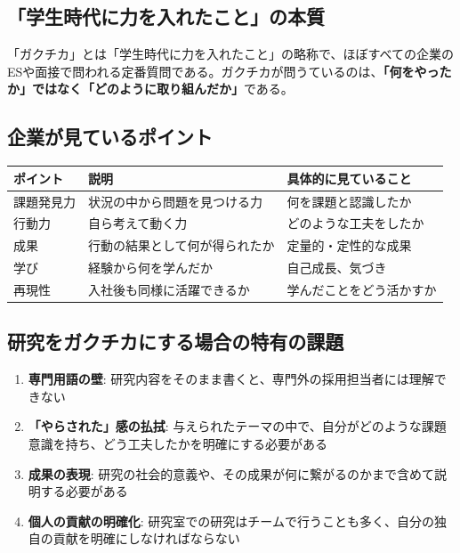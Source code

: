 \subsection*{「学生時代に力を入れたこと」の本質}

「ガクチカ」とは「学生時代に力を入れたこと」の略称で、ほぼすべての企業のESや面接で問われる定番質問である。ガクチカが問うているのは、\textbf{「何をやったか」ではなく「どのように取り組んだか」}である。

\subsection*{企業が見ているポイント}

\begin{table}[H]
\centering
\small
\begin{tabular}{lll}
\toprule
ポイント & 説明 & 具体的に見ていること \\
\midrule
課題発見力 & 状況の中から問題を見つける力 & 何を課題と認識したか \\
行動力 & 自ら考えて動く力 & どのような工夫をしたか \\
成果 & 行動の結果として何が得られたか & 定量的・定性的な成果 \\
学び & 経験から何を学んだか & 自己成長、気づき \\
再現性 & 入社後も同様に活躍できるか & 学んだことをどう活かすか \\
\bottomrule
\end{tabular}
\end{table}

\subsection*{研究をガクチカにする場合の特有の課題}

\begin{enumerate}
\item \textbf{専門用語の壁}: 研究内容をそのまま書くと、専門外の採用担当者には理解できない
\item \textbf{「やらされた」感の払拭}: 与えられたテーマの中で、自分がどのような課題意識を持ち、どう工夫したかを明確にする必要がある
\item \textbf{成果の表現}: 研究の社会的意義や、その成果が何に繋がるのかまで含めて説明する必要がある
\item \textbf{個人の貢献の明確化}: 研究室での研究はチームで行うことも多く、自分の独自の貢献を明確にしなければならない
\end{enumerate}

